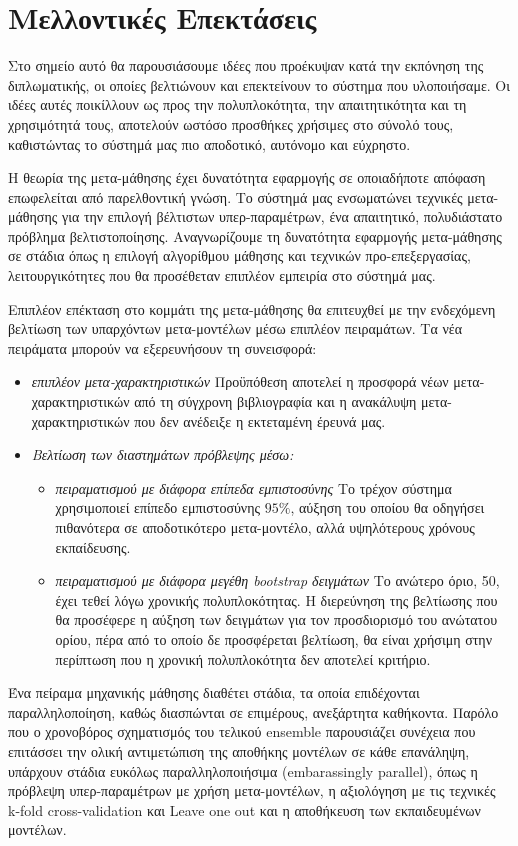 \chapter{Μελλοντικές Επεκτάσεις}
Στο σημείο αυτό θα παρουσιάσουμε ιδέες που προέκυψαν κατά την εκπόνηση της διπλωματικής, οι οποίες βελτιώνουν και επεκτείνουν το σύστημα που υλοποιήσαμε. Οι ιδέες αυτές ποικίλλουν ως προς την πολυπλοκότητα, την απαιτητικότητα και τη χρησιμότητά τους, αποτελούν ωστόσο προσθήκες χρήσιμες στο σύνολό τους, καθιστώντας το σύστημά μας πιο αποδοτικό, αυτόνομο και εύχρηστο.

Η θεωρία της μετα-μάθησης έχει δυνατότητα εφαρμογής σε οποιαδήποτε απόφαση επωφελείται από παρελθοντική γνώση. Το σύστημά μας ενσωματώνει τεχνικές μετα-μάθησης για την επιλογή βέλτιστων υπερ-παραμέτρων, ένα απαιτητικό, πολυδιάστατο πρόβλημα βελτιστοποίησης. Αναγνωρίζουμε τη δυνατότητα εφαρμογής μετα-μάθησης σε στάδια όπως η επιλογή αλγορίθμου μάθησης και τεχνικών προ-επεξεργασίας, λειτουργικότητες που θα προσέθεταν επιπλέον εμπειρία στο σύστημά μας. 

Επιπλέον επέκταση στο κομμάτι της μετα-μάθησης θα επιτευχθεί με την ενδεχόμενη βελτίωση των υπαρχόντων μετα-μοντέλων μέσω επιπλέον πειραμάτων. Τα νέα πειράματα μπορούν να εξερευνήσουν τη συνεισφορά:
\begin{itemize}
	\item \textit{επιπλέον μετα-χαρακτηριστικών} Προϋπόθεση αποτελεί η προσφορά νέων μετα-χαρακτηρι\-στικών από τη σύγχρονη βιβλιογραφία και η ανακάλυψη μετα-χαρακτηριστικών που δεν ανέδειξε η εκτεταμένη έρευνά μας.
	\item \textit{Βελτίωση των διαστημάτων πρόβλεψης μέσω:}
	\begin{itemize}
		\item \textit{πειραματισμού με διάφορα επίπεδα εμπιστοσύνης} Το τρέχον σύστημα χρησιμοποιεί επίπεδο εμπιστοσύνης $95\%$, αύξηση του οποίου θα οδηγήσει πιθανότερα σε αποδοτικότερο μετα-μοντέλο, αλλά υψηλότερους χρόνους εκπαίδευσης.
		\item \textit{πειραματισμού με διάφορα μεγέθη bootstrap δειγμάτων} Το ανώτερο όριο, 50, έχει τεθεί λόγω χρονικής πολυπλοκότητας. Η διερεύνηση της βελτίωσης που θα προσέφερε η αύξηση των δειγμάτων για τον προσδιορισμό του ανώτατου ορίου, πέρα από το οποίο δε προσφέρεται βελτίωση, θα είναι χρήσιμη στην περίπτωση που η χρονική πολυπλοκότητα δεν αποτελεί κριτήριο.
	\end{itemize} 
\end{itemize}

Ένα πείραμα μηχανικής μάθησης διαθέτει στάδια, τα οποία επιδέχονται παραλληλοποίηση, καθώς διασπώνται σε επιμέρους, ανεξάρτητα καθήκοντα. Παρόλο που ο χρονοβόρος σχηματισμός του τελικού ensemble παρουσιάζει συνέχεια που επιτάσσει την ολική αντιμετώπιση της αποθήκης μοντέλων σε κάθε επανάληψη, υπάρχουν στάδια ευκόλως παραλληλοποιήσιμα (embarassingly parallel), όπως η πρόβλεψη υπερ-παραμέτρων με χρήση μετα-μοντέλων, η αξιολόγηση με τις τεχνικές k-fold cross-validation και Leave one out και η αποθήκευση των εκπαιδευμένων μοντέλων.

